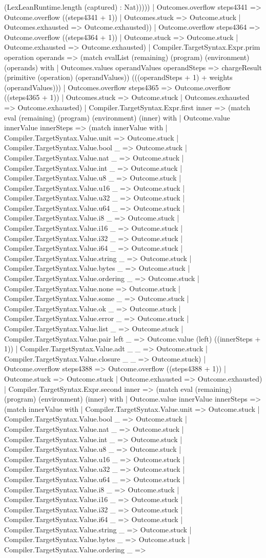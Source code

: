 \documentclass[11pt]{article}
\begin{document}
(LexLeanRuntime.length (captured) : Nat))))) | Outcomes.overflow steps4341 => Outcome.overflow ((steps4341 + 1)) | Outcomes.stuck => Outcome.stuck | Outcomes.exhausted => Outcome.exhausted)) | Outcome.overflow steps4364 => Outcome.overflow ((steps4364 + 1)) | Outcome.stuck => Outcome.stuck | Outcome.exhausted => Outcome.exhausted) | Compiler.TargetSyntax.Expr.prim operation operands => (match evalList (remaining) (program) (environment) (operands) with | Outcomes.values operandValues operandSteps => chargeResult (primitive (operation) (operandValues)) (((operandSteps + 1) + weights (operandValues))) | Outcomes.overflow steps4365 => Outcome.overflow ((steps4365 + 1)) | Outcomes.stuck => Outcome.stuck | Outcomes.exhausted => Outcome.exhausted) | Compiler.TargetSyntax.Expr.first inner => (match eval (remaining) (program) (environment) (inner) with | Outcome.value innerValue innerSteps => (match innerValue with | Compiler.TargetSyntax.Value.unit => Outcome.stuck | Compiler.TargetSyntax.Value.bool \_ => Outcome.stuck | Compiler.TargetSyntax.Value.nat \_ => Outcome.stuck | Compiler.TargetSyntax.Value.int \_ => Outcome.stuck | Compiler.TargetSyntax.Value.u8 \_ => Outcome.stuck | Compiler.TargetSyntax.Value.u16 \_ => Outcome.stuck | Compiler.TargetSyntax.Value.u32 \_ => Outcome.stuck | Compiler.TargetSyntax.Value.u64 \_ => Outcome.stuck | Compiler.TargetSyntax.Value.i8 \_ => Outcome.stuck | Compiler.TargetSyntax.Value.i16 \_ => Outcome.stuck | Compiler.TargetSyntax.Value.i32 \_ => Outcome.stuck | Compiler.TargetSyntax.Value.i64 \_ => Outcome.stuck | Compiler.TargetSyntax.Value.string \_ => Outcome.stuck | Compiler.TargetSyntax.Value.bytes \_ => Outcome.stuck | Compiler.TargetSyntax.Value.ordering \_ => Outcome.stuck | Compiler.TargetSyntax.Value.none => Outcome.stuck | Compiler.TargetSyntax.Value.some \_ => Outcome.stuck | Compiler.TargetSyntax.Value.ok \_ => Outcome.stuck | Compiler.TargetSyntax.Value.error \_ => Outcome.stuck | Compiler.TargetSyntax.Value.list \_ => Outcome.stuck | Compiler.TargetSyntax.Value.pair left \_ => Outcome.value (left) ((innerSteps + 1)) | Compiler.TargetSyntax.Value.adt \_ \_ => Outcome.stuck | Compiler.TargetSyntax.Value.closure \_ \_ => Outcome.stuck) | Outcome.overflow steps4388 => Outcome.overflow ((steps4388 + 1)) | Outcome.stuck => Outcome.stuck | Outcome.exhausted => Outcome.exhausted) | Compiler.TargetSyntax.Expr.second inner => (match eval (remaining) (program) (environment) (inner) with | Outcome.value innerValue innerSteps => (match innerValue with | Compiler.TargetSyntax.Value.unit => Outcome.stuck | Compiler.TargetSyntax.Value.bool \_ => Outcome.stuck | Compiler.TargetSyntax.Value.nat \_ => Outcome.stuck | Compiler.TargetSyntax.Value.int \_ => Outcome.stuck | Compiler.TargetSyntax.Value.u8 \_ => Outcome.stuck | Compiler.TargetSyntax.Value.u16 \_ => Outcome.stuck | Compiler.TargetSyntax.Value.u32 \_ => Outcome.stuck | Compiler.TargetSyntax.Value.u64 \_ => Outcome.stuck | Compiler.TargetSyntax.Value.i8 \_ => Outcome.stuck | Compiler.TargetSyntax.Value.i16 \_ => Outcome.stuck | Compiler.TargetSyntax.Value.i32 \_ => Outcome.stuck | Compiler.TargetSyntax.Value.i64 \_ => Outcome.stuck | Compiler.TargetSyntax.Value.string \_ => Outcome.stuck | Compiler.TargetSyntax.Value.bytes \_ => Outcome.stuck | Compiler.TargetSyntax.Value.ordering \_ => 
\end{document}
